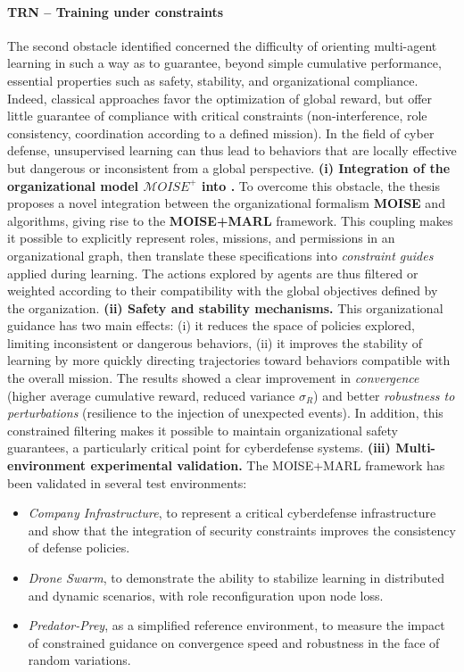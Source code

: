 \paragraph{TRN – Training under constraints}
The second obstacle identified concerned the difficulty of orienting multi-agent learning in such a way as to guarantee, beyond simple cumulative performance, essential properties such as safety, stability, and organizational compliance.
Indeed, classical  approaches favor the optimization of global reward, but offer little guarantee of compliance with critical constraints (non-interference, role consistency, coordination according to a defined mission).
In the field of cyber defense, unsupervised learning can thus lead to behaviors that are locally effective but dangerous or inconsistent from a global perspective.
\medskip
\noindent
\textbf{(i) Integration of the organizational model $\mathcal{M}OISE^+$ into .}
To overcome this obstacle, the thesis proposes a novel integration between the organizational formalism \textbf{MOISE} and  algorithms, giving rise to the \textbf{MOISE+MARL} framework.
This coupling makes it possible to explicitly represent roles, missions, and permissions in an organizational graph, then translate these specifications into \textit{constraint guides} applied during learning.
The actions explored by agents are thus filtered or weighted according to their compatibility with the global objectives defined by the organization.
\medskip
\noindent
\textbf{(ii) Safety and stability mechanisms.}
This organizational guidance has two main effects:
(i) it reduces the space of policies explored, limiting inconsistent or dangerous behaviors,
(ii) it improves the stability of learning by more quickly directing trajectories toward behaviors compatible with the overall mission.
The results showed a clear improvement in \textit{convergence} (higher average cumulative reward, reduced variance $\sigma_R$) and better \textit{robustness to perturbations} (resilience to the injection of unexpected events).
In addition, this constrained filtering makes it possible to maintain organizational safety guarantees, a particularly critical point for cyberdefense systems.
\medskip
\noindent
\textbf{(iii) Multi-environment experimental validation.}
The MOISE+MARL framework has been validated in several test environments:
\begin{itemize}
  \item \textit{Company Infrastructure}, to represent a critical cyberdefense infrastructure and show that the integration of security constraints improves the consistency of defense policies.
  \item \textit{Drone Swarm}, to demonstrate the ability to stabilize learning in distributed and dynamic scenarios, with role reconfiguration upon node loss.

  \item \textit{Predator-Prey}, as a simplified reference environment, to measure the impact of constrained guidance on convergence speed and robustness in the face of random variations.
\end{itemize}
